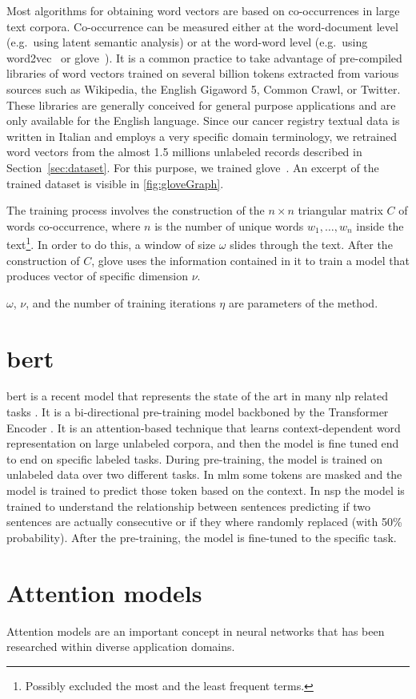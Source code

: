 Most algorithms for obtaining word vectors are based on co-occurrences
in large text corpora. Co-occurrence can be measured either at the
word-document level (e.g.\ using latent semantic analysis) or at the
word-word level (e.g.\ using word2vec~\cite{mikolov_linguistic_2013}
or \ac{glove}~\cite{pennington_glove:_2014}). It is a common practice to
take advantage of pre-compiled libraries of word vectors trained on
several billion tokens extracted from various sources such as
Wikipedia, the English Gigaword 5, Common Crawl, or Twitter. These
libraries are generally conceived for general purpose applications and
are only available for the English language. Since our cancer registry
textual data is written in Italian and employs a very specific domain
terminology, we retrained word vectors from the almost 1.5 millions
unlabeled records described in Section~\ref{sec:dataset}. For this
purpose, we trained \ac{glove}~\cite{pennington_glove:_2014}. An
excerpt of the trained dataset is visible in \cref{fig:gloveGraph}.

The training process involves the construction of the
$n\times n$ triangular matrix $C$ of words co-occurrence, where $n$ is
the number of unique words $w_1,\dots,w_n$ inside the text\footnote{Possibly excluded the
  most and the least frequent terms.}. In order to do this, a window of
size $\omega$ slides
through the text. After the construction of $C$, \ac{glove} uses the
information contained in it to train a model that produces vector of
specific dimension $\nu$.

$\omega$, $\nu$, and the number of
training iterations $\eta$ are parameters of the method. 

\section{\acs{bert}}
\ac{bert} \cite{devlin2018bert} is a recent model that represents the
state of the art in many \ac{nlp} related tasks
\cite{chatterjee2019semeval,hu2019introductory,lee2019biobert,tshitoyan2019unsupervised}.
It is a
bi-directional pre-training model backboned by the Transformer Encoder
\cite{vaswani2017attention}. It is an attention-based technique that
learns context-dependent word representation on large unlabeled
corpora, and then the model is fine tuned end to end on specific labeled
tasks. During pre-training, the model is trained
on unlabeled data over two different tasks. In \ac{mlm} some tokens
are masked and the model is trained to predict those token based on
the context. In \ac{nsp} the model is trained to understand the
relationship between sentences predicting if two sentences are actually
consecutive or if they where randomly replaced (with 50\%
probability). After the pre-training, the model is fine-tuned to the
specific task.

\section{Attention models}
Attention models are an important concept in neural networks that has
been researched within diverse application domains.

